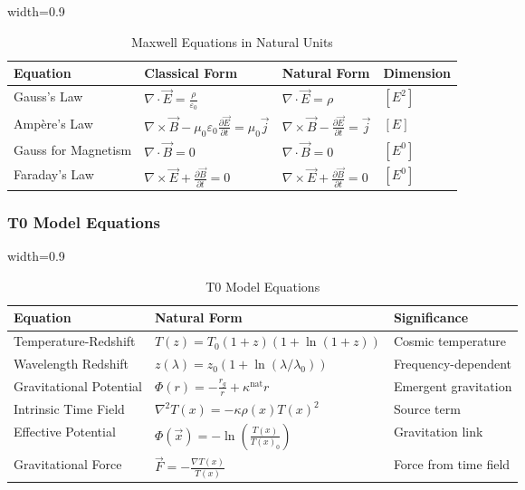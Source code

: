 \documentclass[12pt,a4paper]{article}
\newcommand{\Tfield}{T(x)}
\newcommand{\tablescale}{0.9}
\begin{document}
	\begin{table}[htbp]
		\centering
		\begin{adjustbox}{width=\tablescale\textwidth}
			\begin{tabular}{llll}
				\toprule
				\textbf{Equation} & \textbf{Classical Form} & \textbf{Natural Form} & \textbf{Dimension} \\
				\midrule
				Gauss’s Law & \(\nabla \cdot \vec{E} = \frac{\rho}{\varepsilon_0}\) & \(\nabla \cdot \vec{E} = \rho\) & \([E^2]\) \\
				Ampère’s Law & \(\nabla \times \vec{B} - \mu_0 \varepsilon_0 \frac{\partial \vec{E}}{\partial t} = \mu_0 \vec{j}\) & \(\nabla \times \vec{B} - \frac{\partial \vec{E}}{\partial t} = \vec{j}\) & \([E]\) \\
				Gauss for Magnetism & \(\nabla \cdot \vec{B} = 0\) & \(\nabla \cdot \vec{B} = 0\) & \([E^0]\) \\
				Faraday’s Law & \(\nabla \times \vec{E} + \frac{\partial \vec{B}}{\partial t} = 0\) & \(\nabla \times \vec{E} + \frac{\partial \vec{B}}{\partial t} = 0\) & \([E^0]\) \\
				\bottomrule
			\end{tabular}
		\end{adjustbox}
		\caption{Maxwell Equations in Natural Units}
		\label{tab:maxwell}
	\end{table}
	
	\subsubsection{T0 Model Equations}
	\label{subsec:t0_equations}
	
	\begin{table}[htbp]
		\centering
		\begin{adjustbox}{width=\tablescale\textwidth}
			\begin{tabular}{lll}
				\toprule
				\textbf{Equation} & \textbf{Natural Form} & \textbf{Significance} \\
				\midrule
				Temperature-Redshift & \(T(z) = T_0 (1+z)(1+\ln(1+z))\) & Cosmic temperature \\
				Wavelength Redshift & \(z(\lambda) = z_0 (1+\ln(\lambda/\lambda_0))\) & Frequency-dependent \\
				Gravitational Potential & \(\Phi(r) = -\frac{r_g}{r} + \kappa^{\text{nat}} r\) & Emergent gravitation \\
				Intrinsic Time Field & \(\nabla^2 \Tfield = -\kappa \rho(x) \Tfield^2\) & Source term \\
				Effective Potential & \(\Phi(\vec{x}) = -\ln\left(\frac{\Tfield}{\Tfield_0}\right)\) & Gravitation link \\
				Gravitational Force & \(\vec{F} = -\frac{\nabla \Tfield}{\Tfield}\) & Force from time field \\
				\bottomrule
			\end{tabular}
		\end{adjustbox}
		\caption{T0 Model Equations}
		\label{tab:t0_equations}
	\end{table}
	
\end{document}
